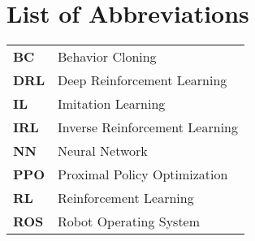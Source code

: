 \chapter*{List of Abbreviations}
\begin{table}[htb]
\centering
    \begin{tabular}{ @{}p{2cm}l@{} } 
    \textbf{BC} & Behavior Cloning\\
    \textbf{DRL} & Deep Reinforcement Learning\\
    \textbf{IL} & Imitation Learning\\
    \textbf{IRL} & Inverse Reinforcement Learning\\
    \textbf{NN} & Neural Network\\
    \textbf{PPO} & Proximal Policy Optimization\\
    \textbf{RL} & Reinforcement Learning\\
    \textbf{ROS} & Robot Operating System\\
    \end{tabular}
\end{table}